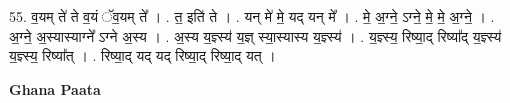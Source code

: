 \documentclass[17pt]{extarticle}
\begin{document}
55. व॒यम् ते॑ ते व॒यं ॅव॒यम् ते᳚ । . त॒ इति॑ ते । . यन् मे॑ मे॒ यद् यन् मे᳚ । . मे॒ अ॒ग्ने॒ ऽग्ने॒ मे॒ मे॒ अ॒ग्ने॒ । . अ॒ग्ने॒ अ॒स्यास्याग्ने᳚ ऽग्ने अ॒स्य । . अ॒स्य य॒ज्ञ्स्य॑ य॒ज्ञ् स्या॒स्यास्य य॒ज्ञ्स्य॑ । . य॒ज्ञ्स्य॒ रिष्या॒द् रिष्या᳚द् य॒ज्ञ्स्य॑ य॒ज्ञ्स्य॒ रिष्या᳚त् । . रिष्या॒द् यद् यद् रिष्या॒द् रिष्या॒द् यत् । \newline

\textbf{Ghana Paata } \newline
\end{document}
